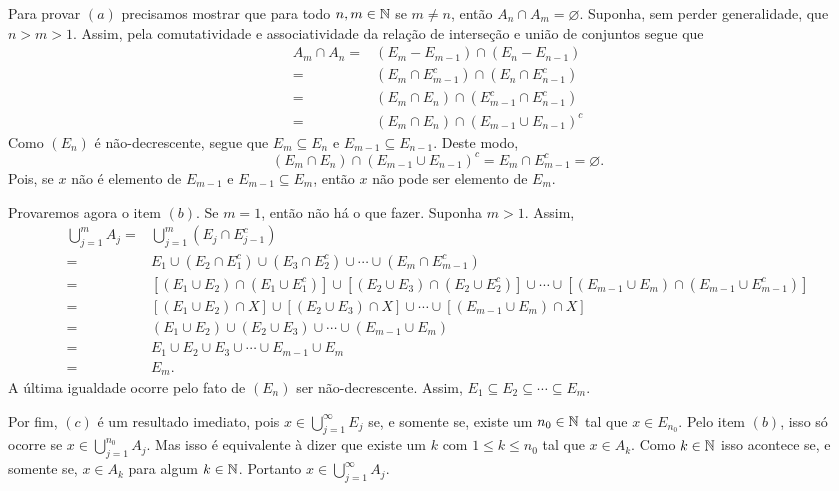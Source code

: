 \begin{prova}
    Para provar $(a)$ precisamos mostrar que para todo $n,m \in \operatorname{\mathbb{N}}$ se $m \neq n$, então $A_n \cap A_m = \varnothing$.
    Suponha, sem perder generalidade, que $n > m > 1$.
    Assim, pela comutatividade e associatividade da relação de interseção e união de conjuntos segue que
    \begin{align*}
        A_m\cap A_n =& (E_m - E_{m -1}) \cap (E_n - E_{n -1})\\
        =& (E_m \cap E_{m -1}^c) \cap (E_n \cap E_{n -1}^c)\\
        =& (E_m \cap E_n) \cap ( E_{m -1}^c\cap E_{n -1}^c)\\
        =& (E_m \cap E_n) \cap \left( E_{m -1}\cup E_{n -1}\right)^c
    \end{align*}
	Como $(E_n)$ é não-decrescente, segue que $E_m \subseteq E_n$ e $E_{m-1}\subseteq E_{n-1}$.
    Deste modo, 
    $$
    (E_m \cap E_n) \cap \left( E_{m -1}\cup E_{n -1}\right)^c
    =
    E_m \cap E_{m-1}^c
    = \varnothing.
    $$
	Pois, se $x$ não é elemento de $E_{m-1}$ e $E_{m-1} \subseteq E_m$, então $x$ não pode ser elemento de $E_m$.
    
    Provaremos agora o item $(b)$.
 	Se $m = 1$, então não há o que fazer.
 	Suponha $m > 1$.
 	Assim, 
 	\begin{align*}
 		\bigcup_{j = 1}^m A_j
 		=&
 		\bigcup_{j = 1}^m(E_j\cap E_{j-1}^c)\\
 		=&
 		E_1 \cup (E_2\cap E_{1}^c) \cup (E_3\cap E_{2}^c) \cup \cdots
 		\cup (E_m\cap E_{m-1}^c)\\
 		=&
 		\left[(E_1 \cup E_2)\cap (E_1\cup E_{1}^c)\right]
 		\cup
 		\left[(E_2 \cup E_3)\cap (E_2\cup E_{2}^c)\right]
 		\cup
 		\cdots
 		\cup 
 		\left[(E_{m-1} \cup E_m)\cap (E_{m-1}\cup E_{m-1}^c)\right]\\
 		=&
 		\left[(E_1 \cup E_2)\cap X\right]
 		\cup
 		\left[(E_2 \cup E_3)\cap X\right]
 		\cup
 		\cdots
 		\cup 
 		\left[(E_{m-1} \cup E_m)\cap X\right]\\
 		=&
 		(E_1 \cup E_2)
 		\cup
 		(E_2 \cup E_3)
 		\cup
 		\cdots
 		\cup 
 		(E_{m-1} \cup E_m)\\
 		=&
 		E_1 \cup E_2 \cup E_3\cup 
 		\cdots
 		\cup E_{m-1} \cup E_m\\
 		=& E_m.
 	\end{align*}
	A última igualdade ocorre pelo fato de $(E_n)$ ser não-decrescente.
	Assim, $E_1 \subseteq E_2 \subseteq \cdots \subseteq E_m$.
	
    Por fim, $(c)$ é um resultado imediato, pois $ x \in \displaystyle \bigcup_{j = 1}^\infty E_j$ se, e somente se, 
    existe um $n_0 \in \operatorname{\mathbb{N}}$ tal que $x \in E_{n_0}$. 
    Pelo item $(b)$, isso só ocorre se $x \in \displaystyle \bigcup_{j = 1}^{n_0}A_j$.
    Mas isso é equivalente à dizer que existe um $k$ com $1\leq k\leq n_0$ tal que $x \in A_k$.
    Como $k \in \operatorname{\mathbb{N}}$ isso acontece se, e somente se, $x \in A_k$ para algum $k \in \operatorname{\mathbb{N}}$.
    Portanto $x \in \displaystyle \bigcup_{j = 1}^\infty A_j$.
\end{prova}

